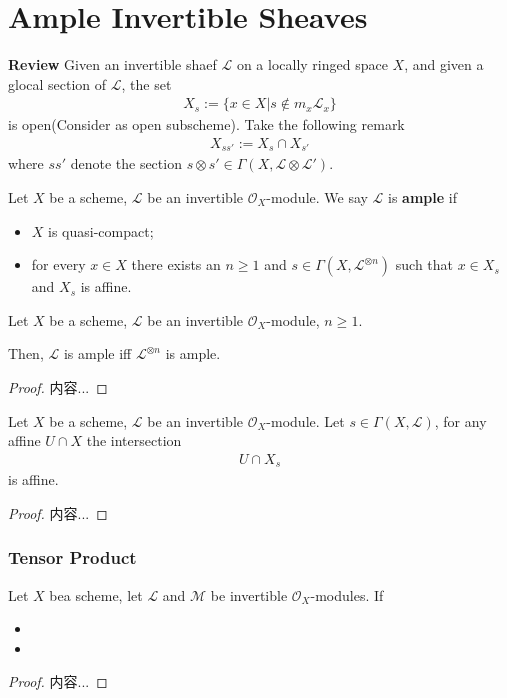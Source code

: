 \documentclass[Total.tex]{subfiles}
\begin{document}
		\section{Ample Invertible Sheaves}
			\textbf{Review} Given an invertible shaef $\mathcal{L}$ on a locally ringed space $X$, and given a glocal section of $\mathcal{L}$, the set
			\begin{gather*}
				X_s:=\{x\in X|s\notin m_x \mathcal{L}_x\}
			\end{gather*}
			is open(Consider as open subscheme). Take the following remark
			\begin{gather*}
				X_{ss'}:=X_s\cap X_{s'}
			\end{gather*}
			where $ss'$ denote the section $s\otimes s'\in \Gamma(X,\mathcal{L}\otimes \mathcal{L}')$. 
			\begin{Def}
				Let $X$ be a scheme, $\mathcal{L}$ be an invertible $\mathcal{O}_X$-module. We say $\mathcal{L}$ is \textbf{ample} if
				\begin{itemize}
					\item $X$ is quasi-compact;
					\item for every $x\in X$ there exists an $n\geq 1$ and $s\in \Gamma(X,\mathcal{L}^{\otimes n})$ such that $x\in X_s$ and $X_s$ is affine.
				\end{itemize}
			\end{Def}
			\begin{lemma}
				Let $X$ be a scheme, $\mathcal{L}$ be an invertible $\mathcal{O}_X$-module, $n\geq 1$. 
				
				Then, $\mathcal{L}$ is ample iff $\mathcal{L}^{\otimes n}$ is ample.
			\end{lemma}
			\begin{proof}
				内容...
			\end{proof}
			
			\begin{lemma}
				Let $X$ be a scheme, $\mathcal{L}$ be an invertible $\mathcal{O}_X$-module. Let $s\in \Gamma(X,\mathcal{L})$, for any affine $U\cap X$ the intersection
				\begin{gather*}
					U\cap X_s
				\end{gather*}
				is affine.
			\end{lemma}
			\begin{proof}
				内容...
			\end{proof}
			\subsubsection{Tensor Product}
			\begin{lemma}
				Let $X$ bea scheme, let $\mathcal{L}$ and $\mathcal{M}$ be invertible $\mathcal{O}_X$-modules. If 
				\begin{itemize}
					\item 
					\item 
				\end{itemize}
			\end{lemma}
			\begin{proof}
				内容...
			\end{proof}
\end{document}
